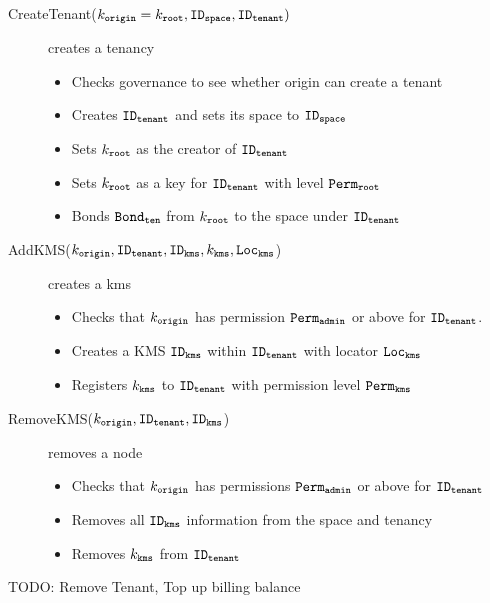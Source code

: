 \begin{description}
  \item[CreateTenant($k_\mathtt{origin} = k_\mathtt{root}, \mathtt{ID_{space}}, \mathtt{ID_{tenant}})$] creates a tenancy
    \begin{itemize}
      \item Checks governance to see whether origin can create a tenant
      \item Creates $\mathtt{ID_{tenant}}$ and sets its space to $\mathtt{ID_{space}}$
      \item Sets $k_\mathtt{root}$ as the creator of $\mathtt{ID_{tenant}}$
      \item Sets $k_\mathtt{root}$ as a key for $\mathtt{ID_{tenant}}$ with level $\mathtt{Perm_{root}}$
      \item Bonds $\mathtt{Bond_{ten}}$ from $k_\mathtt{root}$ to the space under $\mathtt{ID_{tenant}}$
    \end{itemize}
  \item[AddKMS($k_\mathtt{origin}, \mathtt{ID_{tenant}}, \mathtt{ID_{kms}}, k_\mathtt{kms}, \mathtt{Loc_{kms}}$)] creates a kms
    \begin{itemize}
      \item Checks that $k_\mathtt{origin}$ has permission $\mathtt{Perm_{admin}}$ or above for $\mathtt{ID_{tenant}}$.
      \item Creates a KMS $\mathtt{ID_{kms}}$ within $\mathtt{ID_{tenant}}$ with locator $\mathtt{Loc_{kms}}$
      \item Registers $k_\mathtt{kms}$ to $\mathtt{ID_{tenant}}$ with permission level $\mathtt{Perm_{kms}}$
    \end{itemize}
  \item[RemoveKMS($k_\mathtt{origin}, \mathtt{ID_{tenant}}, \mathtt{ID_{kms}}$)] removes a node
    \begin{itemize}
      \item Checks that $k_\mathtt{origin}$ has permissions $\mathtt{Perm_{admin}}$ or above for $\mathtt{ID_{tenant}}$
      \item Removes all $\mathtt{ID_{kms}}$ information from the space and tenancy
      \item Removes $k_\mathtt{kms}$ from $\mathtt{ID_{tenant}}$
    \end{itemize}
  \item[TODO: Remove Tenant, Top up billing balance]
\end{description}
